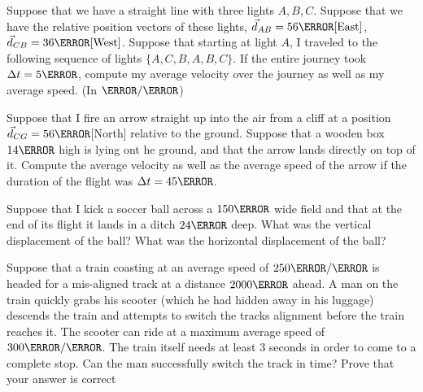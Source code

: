 \documentclass[12pt]{article} %
\newcommand{\tx}[1]{\text{#1}}
\begin{document}
\begin{qstn}[6]
	

\end{qstn}


\begin{qstn}[7]
Suppose that we have a straight line with three lights $A,B,C$. Suppose that we have the relative position vectors of these lights, $\vec d_{AB} = 56\m\tx{[East]}$, $\vec d_{CB} = 36\m\tx{[West]}$. Suppose that starting at light $A$, I traveled to the following sequence of lights $\{A,C,B,A,B,C\}$. If the entire journey took $\Delta t = 5\m$, compute my average velocity over the journey as well as my average speed. (In $\m / \s$) 

\end{qstn}


\begin{qstn}[8]
Suppose that I fire an arrow straight up into the air from a cliff at a position $\vec d_{CG} = 56\m$[North] relative to the ground. Suppose that a wooden box $14\m$ high is lying ont he ground, and that the arrow lands directly on top of it. Compute the average velocity as well as the average speed of the arrow if the duration of the flight was $\Delta t = 45\s$. 
\end{qstn}

\begin{qstn}[9]
Suppose that I kick a soccer ball across a $150\m$ wide field and that at the end of its flight it lands in a ditch $24\m$ deep. What was the vertical displacement of the ball? What was the horizontal displacement of the ball? 

\end{qstn}

\begin{qstn}[10]
Suppose that a train coasting at an average speed of $250 \m / \s$ is headed for a mis-aligned track at a distance $2000\m$ ahead. A man on the train quickly grabs his scooter (which he had hidden away in his luggage) descends the train and attempts to switch the tracks alignment before the train reaches it. The scooter can ride at a maximum average speed of $300 \m / \s$. The train itself needs at least $3$ seconds in order to come to a complete stop. Can the man successfully switch the track in time? Prove that your answer is correct
\end{qstn}
\end{document}

